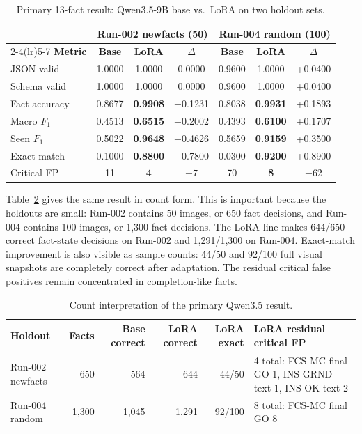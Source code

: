 \begin{table}[htbp]
\centering
\caption{Primary 13-fact result: Qwen3.5-9B base vs.\ LoRA on two holdout sets.}
\label{tab:qwen35-primary}
\small
\begin{tabular}{@{}lccc ccc@{}}
\toprule
& \multicolumn{3}{c}{\textbf{Run-002 newfacts (50)}} & \multicolumn{3}{c}{\textbf{Run-004 random (100)}} \\
\cmidrule(lr){2-4}\cmidrule(lr){5-7}
\textbf{Metric} & \textbf{Base} & \textbf{LoRA} & \textbf{$\Delta$} & \textbf{Base} & \textbf{LoRA} & \textbf{$\Delta$} \\
\midrule
JSON valid & 1.0000 & 1.0000 & 0.0000 & 0.9600 & 1.0000 & +0.0400 \\
Schema valid & 1.0000 & 1.0000 & 0.0000 & 0.9600 & 1.0000 & +0.0400 \\
Fact accuracy & 0.8677 & \textbf{0.9908} & +0.1231 & 0.8038 & \textbf{0.9931} & +0.1893 \\
Macro $F_1$ & 0.4513 & \textbf{0.6515} & +0.2002 & 0.4393 & \textbf{0.6100} & +0.1707 \\
Seen $F_1$ & 0.5022 & \textbf{0.9648} & +0.4626 & 0.5659 & \textbf{0.9159} & +0.3500 \\
Exact match & 0.1000 & \textbf{0.8800} & +0.7800 & 0.0300 & \textbf{0.9200} & +0.8900 \\
Critical FP & 11 & \textbf{4} & $-7$ & 70 & \textbf{8} & $-62$ \\
\bottomrule
\end{tabular}
\end{table}

Table~\ref{tab:qwen35-counts} gives the same result in count form. This is
important because the holdouts are small: Run-002 contains 50 images, or 650
fact decisions, and Run-004 contains 100 images, or 1,300 fact decisions. The
LoRA line makes 644/650 correct fact-state decisions on Run-002 and 1,291/1,300
on Run-004. Exact-match improvement is also visible as sample counts: 44/50
and 92/100 full visual snapshots are completely correct after adaptation. The
residual critical false positives remain concentrated in completion-like facts.

\begin{table}[htbp]
\centering
\caption{Count interpretation of the primary Qwen3.5 result.}
\label{tab:qwen35-counts}
\small
\begin{tabularx}{\textwidth}{@{}lrrrrX@{}}
\toprule
\textbf{Holdout} & \textbf{Facts} & \textbf{Base correct} & \textbf{LoRA correct} & \textbf{LoRA exact} & \textbf{LoRA residual critical FP} \\
\midrule
Run-002 newfacts & 650 & 564 & 644 & 44/50 & 4 total: FCS-MC final GO 1, INS GRND text 1, INS OK text 2 \\
Run-004 random & 1,300 & 1,045 & 1,291 & 92/100 & 8 total: FCS-MC final GO 8 \\
\bottomrule
\end{tabularx}
\end{table}


